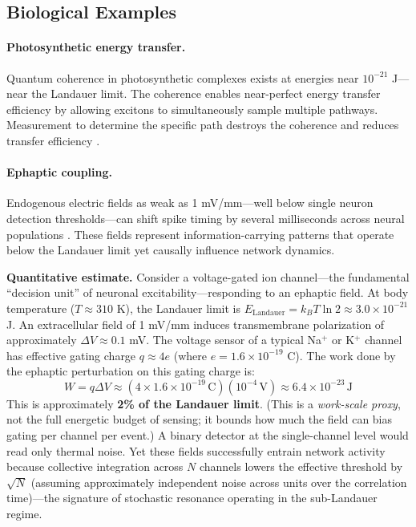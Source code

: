 \documentclass[12pt]{article}
\begin{document}
\subsection{Biological Examples}

\paragraph{Photosynthetic energy transfer.} Quantum coherence in photosynthetic complexes exists at energies near $10^{-21}$ J---near the Landauer limit. The coherence enables near-perfect energy transfer efficiency by allowing excitons to simultaneously sample multiple pathways. Measurement to determine the specific path destroys the coherence and reduces transfer efficiency \cite{engel2007,cao2020}.

\paragraph{Ephaptic coupling.} Endogenous electric fields as weak as 1 mV/mm---well below single neuron detection thresholds---can shift spike timing by several milliseconds across neural populations \cite{anastassiou2011,chiang2019}. These fields represent information-carrying patterns that operate below the Landauer limit yet causally influence network dynamics.

\textbf{Quantitative estimate.} Consider a voltage-gated ion channel---the fundamental ``decision unit'' of neuronal excitability---responding to an ephaptic field. At body temperature ($T \approx 310$ K), the Landauer limit is $E_{\text{Landauer}} = k_B T \ln 2 \approx 3.0 \times 10^{-21}$ J. An extracellular field of 1 mV/mm induces transmembrane polarization of approximately $\Delta V \approx 0.1$ mV. The voltage sensor of a typical Na$^+$ or K$^+$ channel has effective gating charge $q \approx 4e$ (where $e = 1.6 \times 10^{-19}$ C). The work done by the ephaptic perturbation on this gating charge is:
\begin{equation}
W = q \Delta V \approx (4 \times 1.6 \times 10^{-19}\,\text{C})(10^{-4}\,\text{V}) \approx 6.4 \times 10^{-23}\,\text{J}
\end{equation}
This is approximately \textbf{2\% of the Landauer limit}. (This is a \emph{work-scale proxy}, not the full energetic budget of sensing; it bounds how much the field can bias gating per channel per event.) A binary detector at the single-channel level would read only thermal noise. Yet these fields successfully entrain network activity because collective integration across $N$ channels lowers the effective threshold by $\sqrt{N}$ (assuming approximately independent noise across units over the correlation time)---the signature of stochastic resonance operating in the sub-Landauer regime.
\end{document}
